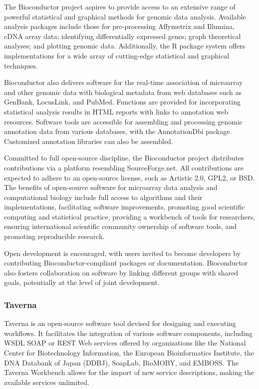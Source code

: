             The Bioconductor project aspires to provide access to an extensive range of powerful statistical and graphical methods for genomic data analysis. Available analysis packages include those for pre-processing Affymetrix and Illumina, cDNA array data; identifying differentially expressed genes; graph theoretical analyses; and plotting genomic data. Additionally, the R package system offers implementations for a wide array of cutting-edge statistical and graphical techniques.
            
            Bioconductor also delivers software for the real-time association of microarray and other genomic data with biological metadata from web databases such as GenBank, LocusLink, and PubMed. Functions are provided for incorporating statistical analysis results in HTML reports with links to annotation web resources. Software tools are accessible for assembling and processing genomic annotation data from various databases, with the AnnotationDbi package. Customized annotation libraries can also be assembled.
            
            Committed to full open-source discipline, the Bioconductor project distributes contributions via a platform resembling SourceForge.net. All contributions are expected to adhere to an open-source license, such as Artistic 2.0, GPL2, or BSD. The benefits of open-source software for microarray data analysis and computational biology include full access to algorithms and their implementations, facilitating software improvements, promoting good scientific computing and statistical practice, providing a workbench of tools for researchers, ensuring international scientific community ownership of software tools, and promoting reproducible research.
            
            Open development is encouraged, with users invited to become developers by contributing Bioconductor-compliant packages or documentation. Bioconductor also fosters collaboration on software by linking different groups with shared goals, potentially at the level of joint development.

        \subsubsection{Taverna}
            Taverna is an open-source software tool devised for designing and executing workflows\cite{hull2006taverna}. It facilitates the integration of various software components, including WSDL SOAP or REST Web services offered by organizations like the National Center for Biotechnology Information, the European Bioinformatics Institute, the DNA Databank of Japan (DDBJ), SoapLab, BioMOBY, and EMBOSS. The Taverna Workbench allows for the import of new service descriptions, making the available services unlimited.
            
